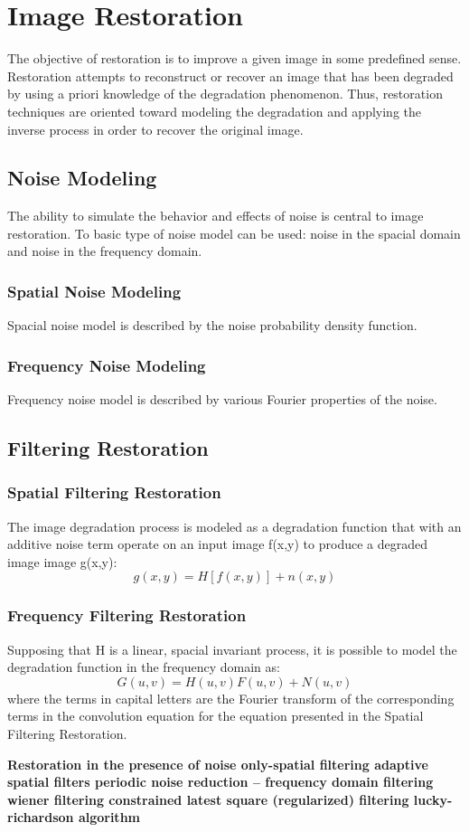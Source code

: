 \section{Image Restoration}

The objective of restoration is to improve a given image in some predefined sense. Restoration attempts to reconstruct or recover an image that has been degraded by using a priori knowledge of the degradation phenomenon. Thus, restoration techniques are oriented toward modeling the degradation and applying the inverse process in order to recover the original image.

\subsection{Noise Modeling}
The ability to simulate the behavior and effects of noise is central to image restoration. To basic type of noise model can be used: noise in the spacial domain and noise in the frequency domain.

\subsubsection{Spatial Noise Modeling}
Spacial noise model is described by the noise probability density function.

\subsubsection{Frequency Noise Modeling}
Frequency noise model is described by various Fourier properties of the noise.

\subsection{Filtering Restoration}

\subsubsection{Spatial Filtering Restoration}
The  image degradation process is modeled as a degradation function that with an additive noise term operate on an input image f(x,y) to produce a degraded image image g(x,y):
\begin{equation}
	g(x,y) = H[f(x,y)] + n(x,y)
\end{equation}

\subsubsection{Frequency Filtering Restoration}
Supposing that H is a linear, spacial invariant process, it is possible to model the degradation function in the frequency domain as:
\begin{equation}
	G(u,v) = H(u,v)F(u,v) + N(u,v)
\end{equation}
where the terms in capital letters are the Fourier transform of the corresponding terms in the convolution equation for the equation presented in the Spatial Filtering Restoration.

{\bf Restoration in the presence of noise only-spatial filtering
adaptive spatial filters
periodic noise reduction – frequency domain filtering
wiener filtering
constrained latest square (regularized) filtering
lucky-richardson algorithm}

